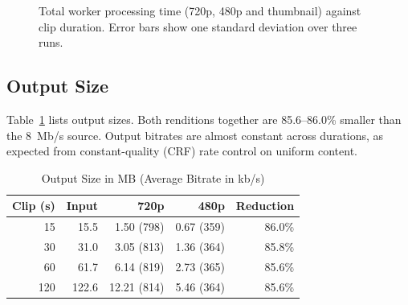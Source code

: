 \documentclass[conference]{IEEEtran}
\begin{document}
\begin{figure}[t]
\centering
{}
\caption{Total worker processing time (720p, 480p and thumbnail) against clip duration. Error bars show one standard deviation over three runs.}
\label{fig:bench}
\end{figure}

\subsection{Output Size}
Table~\ref{tab:size} lists output sizes. Both renditions together are 85.6--86.0\% smaller than the 8~Mb/s source. Output bitrates are almost constant across durations, as expected from constant-quality (CRF) rate control on uniform content.

\begin{table}[t]
\caption{Output Size in MB (Average Bitrate in kb/s)}
\label{tab:size}
\centering
\begin{tabular}{@{}rrrrr@{}}
\toprule
Clip (s) & Input & 720p & 480p & Reduction \\
\midrule
15 & 15.5 & 1.50 (798) & 0.67 (359) & 86.0\% \\
30 & 31.0 & 3.05 (813) & 1.36 (364) & 85.8\% \\
60 & 61.7 & 6.14 (819) & 2.73 (365) & 85.6\% \\
120 & 122.6 & 12.21 (814) & 5.46 (364) & 85.6\% \\
\bottomrule
\end{tabular}
\end{table}
\end{document}
